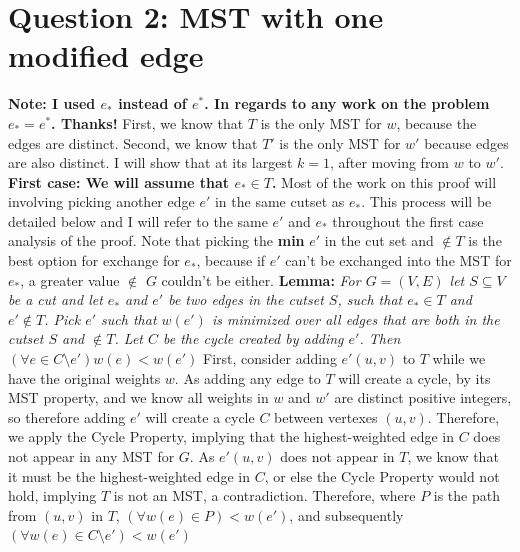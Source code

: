 \documentclass{article}
\begin{document}
\section{Question 2: MST with one modified edge}
\textbf{Note: I used $e_*$ instead of $e^*$. In regards to any work on the problem $e_*=e^*$. Thanks!} \newline \newline
First, we know that $T$ is the only MST for $w$, because the edges are distinct. Second, we know that $T'$ is the only MST for $w'$ because edges are also distinct. I will show that at its largest $k=1$, after moving from $w$ to $w'$. \newline\newline
\textbf{First case: We will assume that $e_* \in T$.} \newline 
Most of the work on this proof will involving picking another edge $e'$ in the same cutset as $e_*$. This process will be detailed below and I will refer to the same $e'$ and $e_*$ throughout the first case analysis of the proof. Note that picking the \textbf{min} $e'$ in the cut set and $\not\in T$ is the best option for exchange for $e_*$, because if $e'$ can't be exchanged into the MST for $e_*$, a greater value $\not \in$ $G$ couldn't be either.\newline
\textbf{Lemma:} \textit{For $G=(V,E)$ let $S \subseteq V$ be a cut and let $e_*$ and $e'$ be two edges in the cutset $S$, such that $e_* \in T$ and $e' \not\in T$. Pick $e'$ such that $w(e')$ is minimized over all edges that are both in the cutset $S$ and $\not\in T$. Let $C$ be the cycle created by adding $e'$. Then $ (\forall e \in C\setminus e') w(e)< w(e') $}\newline 
First, consider adding $e'(u,v)$ to $T$ while we have the original weights $w$. As adding any edge to $T$ will create a cycle, by its MST property, and we know all weights in $w$ and $w'$ are distinct positive integers, so therefore adding $e'$ will create a cycle $C$ between vertexes $(u,v)$. Therefore, we apply the Cycle Property, implying that the highest-weighted edge in $C$ does not appear in any MST for $G$. As $e'(u,v)$ does not appear in $T$, we know that it must be the highest-weighted edge in $C$, or else the Cycle Property would not hold, implying $T$ is not an MST, a contradiction. Therefore, where $P$ is the path from $(u,v)$ in $T$, $ (\forall w(e) \in P) < w(e')$, and subsequently $ (\forall w(e) \in C \setminus e') < w(e')$ \newline \newline 
\end{document}
